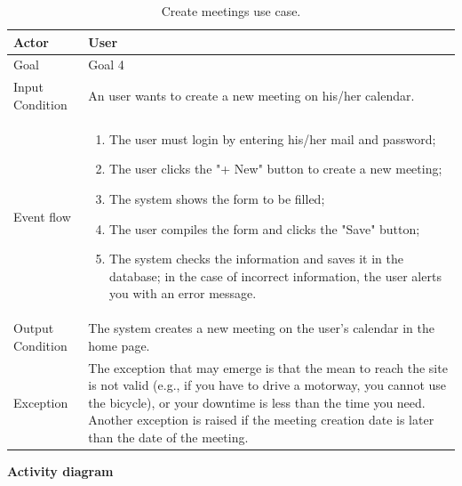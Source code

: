 \documentclass{article}
\begin{document}
	\begin{table}[htp]
	\caption{Create meetings use case.}
		\begin{center}
    			\begin{tabular}{p{}|p{}}
   			 	\hline
    				Actor & User \\ \hline
    				Goal & Goal 4 \\ \hline
    				Input Condition & An user wants to create a new meeting on his/her calendar.\\ \hline
    				Event flow & 
				\begin{enumerate}
  					\item The user must login by entering his/her mail and password;
  					\item The user clicks the "+ New" button to create a new meeting;
  					\item The system shows the form to be filled;
  					\item The user compiles the form and clicks the "Save" button;
  					\item The system checks the information and saves it in the database; in the case of incorrect information, the user alerts you with an error message.
 				 \end{enumerate} \\ \hline
    				Output Condition & The system creates a new meeting on the user's calendar in the home page. \\ \hline
    				Exception & The exception that may emerge is that the mean to reach the site is not valid (e.g., if you have to drive a motorway, you cannot use the bicycle), or your downtime is less than the time you need. Another exception is raised if the meeting creation date is later than the date of the meeting. \\ \hline
    			\end{tabular}
		\end{center}
	\end{table}
	
	\bigskip
	\noindent
	\textbf{Activity diagram} \\
	
\end{document}
